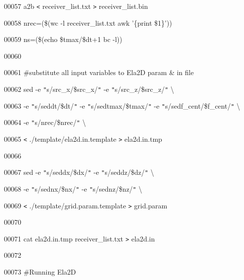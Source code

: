 \documentclass{article}
\begin{document}
\vspace{4pt}
00057 a2b \texttt{<} receiver\_list.txt \texttt{>} receiver\_list.bin

\vspace{4pt}
00058 nrec=(\$(wc -l receiver\_list.txt \textbar{} awk '\{print \$1\}'))

\vspace{4pt}
00059 ns=(\$(echo \$tmax/\$dt+1 \textbar{}bc -l))

\vspace{4pt}
00060 

\vspace{4pt}
00061 \#substitute all input variables to Ela2D param \& in file

\vspace{4pt}
00062 sed -e \texttt{"}s/src\_x/\$src\_x/\texttt{"} -e \texttt{"}s/src\_z/\$src\_z/\texttt{"} 
\textbackslash{}

\vspace{4pt}
00063 -e \texttt{"}s/seddt/\$dt/\texttt{"} -e \texttt{"}s/sedtmax/\$tmax/\texttt{"} 
-e \texttt{"}s/sedf\_cent/\$f\_cent/\texttt{"} \textbackslash{}

\vspace{4pt}
00064 -e \texttt{"}s/nrec/\$nrec/\texttt{"} \textbackslash{}

\vspace{4pt}
00065  \texttt{<} ./template/ela2d.in.template \texttt{>} ela2d.in.tmp

\vspace{4pt}
00066 

\vspace{4pt}
00067 sed -e \texttt{"}s/seddx/\$dx/\texttt{"} -e \texttt{"}s/seddz/\$dz/\texttt{"} 
\textbackslash{}

\vspace{4pt}
00068 -e \texttt{"}s/sednx/\$nx/\texttt{"} -e \texttt{"}s/sednz/\$nz/\texttt{"} 
\textbackslash{}

\vspace{4pt}
00069  \texttt{<} ./template/grid.param.template \texttt{>} grid.param

\vspace{4pt}
00070  

\vspace{4pt}
00071 cat ela2d.in.tmp receiver\_list.txt \texttt{>} ela2d.in

\vspace{4pt}
00072 

\vspace{4pt}
00073 \#Running Ela2D
\end{document}
